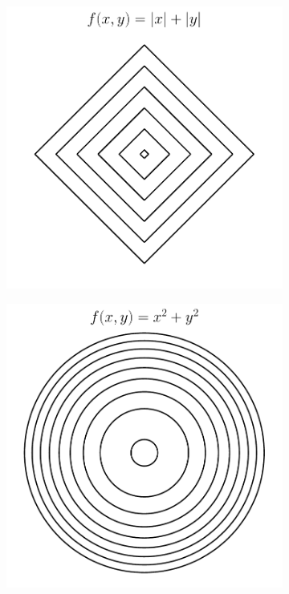 \begin{figure}[t]
    \begin{subfigure}{0.325\textwidth}
        \includegraphics[width=0.99\linewidth]{ebookML_src/src/convexity/abs_2d.pdf}
        \caption{}
    \end{subfigure}
    \begin{subfigure}{0.325\textwidth}
        \includegraphics[height=1.02\linewidth]{ebookML_src/src/convexity/norm_2d.pdf}

\end{subfigure}
\end{figure}
